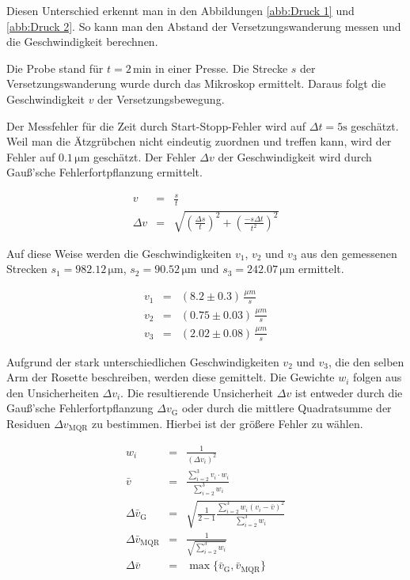 \documentclass[12pt,a4paper]{scrartcl}
\numberwithin{equation}{section} %
\begin{document}
Diesen Unterschied erkennt man in den Abbildungen \ref{abb:Druck 1} und \ref{abb:Druck 2}. So kann man den Abstand der Versetzungswanderung messen und die Geschwindigkeit berechnen.

Die Probe stand für $t=2\mathrm{\,min}$ in einer Presse. Die Strecke
$s$ der Versetzungswanderung wurde durch das Mikroskop ermittelt.
Daraus folgt die Geschwindigkeit $v$ der Versetzungsbewegung.

Der Messfehler für die Zeit durch Start-Stopp-Fehler wird auf
$\Delta t=5\mathrm s$ geschätzt. Weil man die Ätzgrübchen nicht
eindeutig zuordnen und treffen kann, wird der Fehler auf
$0.1\mathrm{\,\mu m}$ geschätzt. Der Fehler $\Delta v$ der
Geschwindigkeit wird durch Gauß'sche Fehlerfortpflanzung ermittelt.

\begin{eqnarray}
    v &=& \frac{s}{t} \\
    \Delta v &=&
        \sqrt{
            \left(\frac{\Delta s}{t}\right)^2
            + \left(\frac{-s \Delta t}{t^2}\right)^2
        }
\end{eqnarray}

\noindent
Auf diese Weise werden die Geschwindigkeiten $v_1$, $v_2$ und
$v_3$ aus den gemessenen Strecken $s_1=982.12\mathrm{\,\mu m}$,
$s_2=90.52\mathrm{\,\mu m}$ und $s_3=242.07\mathrm{\,\mu m}$
ermittelt.

\begin{eqnarray}
    v_1 &=& (8.2 \pm 0.3) \,\frac{\mu m}{s} \\
    v_2 &=& (0.75 \pm 0.03) \,\frac{\mu m}{s} \\
    v_3 &=& (2.02 \pm 0.08) \,\frac{\mu m}{s}
\end{eqnarray}

\noindent
Aufgrund der stark unterschiedlichen Geschwindigkeiten $v_2$ und
$v_3$, die den selben Arm der Rosette beschreiben, werden diese
gemittelt. Die Gewichte $w_i$ folgen aus den Unsicherheiten
$\Delta v_i$. Die resultierende Unsicherheit $\Delta v$ ist entweder
durch die Gauß'sche Fehlerfortpflanzung $\Delta v_\mathrm{G}$ oder
durch die mittlere Quadratsumme der Residuen $\Delta v_\mathrm{MQR}$
zu bestimmen. Hierbei ist der größere Fehler zu wählen.

\begin{eqnarray}
    w_i &=& \frac{1}{(\Delta v_i)^2} \\
    \bar{v} &=& \frac{\sum_{i=2}^{3} v_i\cdot w_i}{\sum_{i=2}^{3} w_i} \\
    \Delta \bar{v}_\mathrm{G} &=&
        \sqrt{\frac{1}{2-1}\frac{\sum_{i=2}^{3}w_i(v_i-\bar{v})^2}{\sum_{i=2}^{3}w_i}} \\
    \Delta \bar{v}_\mathrm{MQR} & = & \frac{1}{\sqrt{\sum_{i=2}^{3}w_i}} \\
    \Delta \bar{v} &=& \max\{\bar{v}_\mathrm{G}, \bar{v}_\mathrm{MQR}\}
\end{eqnarray}
\end{document}
